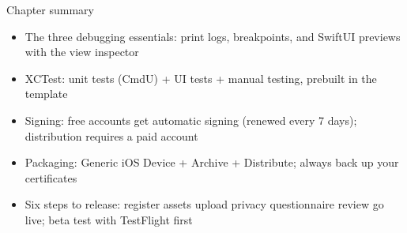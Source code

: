 \begin{tcbsummary}{Chapter summary}
\begin{itemize}
  \item The three debugging essentials: print logs, breakpoints, and SwiftUI previews with the view inspector
  \item XCTest: unit tests (CmdU) + UI tests + manual testing, prebuilt in the template
  \item Signing: free accounts get automatic signing (renewed every 7 days); distribution requires a paid account
  \item Packaging: Generic iOS Device + Archive + Distribute; always back up your certificates
  \item Six steps to release: register assets upload privacy questionnaire review go live; beta test with TestFlight first
\end{itemize}

\end{tcbsummary}
